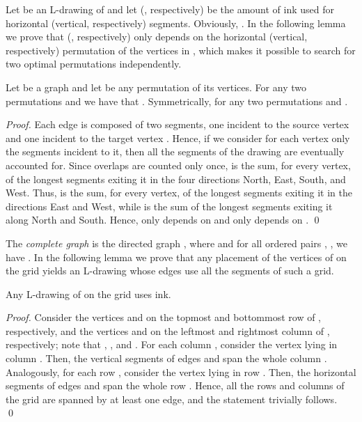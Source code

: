 \documentclass{llncs}
\begin{document}
Let  be an L-drawing of  and let  (, respectively) be the amount of ink used for horizontal (vertical, respectively) segments. Obviously, . In the following lemma we prove that  (, respectively) only depends on the horizontal (vertical, respectively) permutation of the vertices in , which makes it possible to search for two optimal permutations \mbox{independently.}

\begin{lemma}\label{le:separazione}
Let  be a graph and let  be any permutation of its vertices. For any two permutations  and  we have that . Symmetrically,  for any two permutations  and . 
\end{lemma}
\begin{proof}
Each edge  is composed of two segments, one incident to the source vertex  and one incident to the target vertex . Hence, if we consider for each vertex only the segments incident to it, then all the segments of the drawing are eventually accounted for. Since overlaps are counted only once,  is the sum, for every vertex, of the longest segments exiting it in the four directions North, East, South, and West. Thus,  is the sum, for every vertex, of the longest segments exiting it in the directions East and West, while  is the sum of the longest segments exiting it along North and South. Hence,  only depends on  and  only depends on . \qed
\end{proof} 

The \emph{complete graph } is the directed graph , where  and for all ordered pairs , , we have . In the following lemma we prove that any placement of the vertices of  on the  grid yields an L-drawing whose edges use all the segments of such a grid.

\begin{lemma}\label{le:complete-optimal}
Any L-drawing  of  on the  grid uses  ink. 
\end{lemma}
\begin{proof}
Consider the vertices  and  on the topmost and bottommost row of , respectively, and the vertices  and  on the leftmost and rightmost column of , respectively; note that , , and .
For each column , consider the vertex  lying in column . Then, the vertical segments of edges  and  span the whole column . Analogously, for each row , consider the vertex  lying in row . Then, the horizontal segments of edges  and  span the whole row .
Hence, all the rows and columns of the  grid are spanned by at least one edge, and the statement trivially follows.
\qed
\end{proof}
\end{document}
